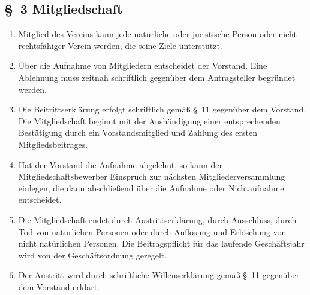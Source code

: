 \documentclass[10pt,a4paper]{scrartcl}
\begin{document}
\subsection*{\S \ 3 Mitgliedschaft}
\begin{enumerate}
	\item Mitglied des Vereins kann jede nat{\"u}rliche oder juristische Person oder
		nicht rechts\-f{\"a}higer Verein werden, die seine Ziele unterst{\"u}tzt.
        \item {\"U}ber die Aufnahme von Mitgliedern entscheidet der Vorstand. Eine Ablehnung muss zeitnah schriftlich gegen{\"u}ber dem Antragsteller begr{\"u}ndet werden.
	\item Die Beitrittserkl{\"a}rung erfolgt schriftlich gem{\"a}{\ss} \S \ 11 gegen{\"u}ber dem Vorstand. Die
		Mitgliedschaft beginnt mit der Aush{\"a}ndigung einer entsprechenden Best{\"a}tigung durch
                ein Vorstandsmitglied und Zahlung des ersten Mitgliedsbeitrages.
	\item Hat der Vorstand die Aufnahme abgelehnt, so kann der Mitgliedschaftsbewerber Einspruch
		zur n{\"a}chsten Mitgliederversammlung einlegen, die dann abschlie{\ss}end {\"u}ber die Aufnahme
		oder Nichtaufnahme entscheidet.
	\item Die Mitgliedschaft endet durch Austrittserkl{\"a}rung, durch Ausschluss, durch Tod von
		nat{\"u}r\-li\-chen Personen oder durch Aufl{\"o}sung und Erl{\"o}schung von nicht
		nat{\"u}r\-lichen Personen.
		Die Beitragspflicht f{\"u}r das laufende Gesch{\"a}ftsjahr wird von der Gesch{\"a}ftsordnung
		geregelt.
	\item Der Austritt wird durch schriftliche Willenserkl{\"a}rung gem{\"a}{\ss} \S \ 11 gegen{\"u}ber dem Vorstand
		erkl{\"a}rt.
\end{enumerate}
%
%
\end{document}
